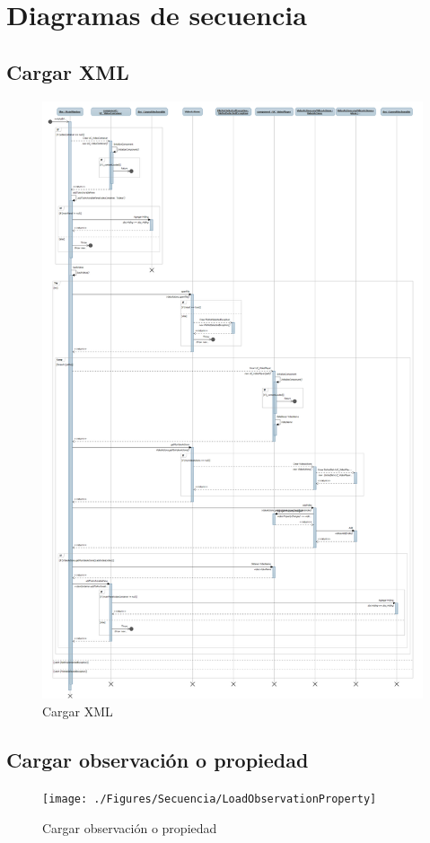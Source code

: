\chapter{Diagramas de secuencia}

\section{Cargar XML}

\begin{figure}[H]
\centering
\includegraphics[width=0.6\linewidth]{./Figures/Secuencia/CargarXML.png}
\caption{Cargar XML}
\label{fig:CargarXML}
\end{figure}


\section{Cargar observaci\'on o propiedad}

\begin{figure}[H]
\centering
\texttt{[image: ./Figures/Secuencia/LoadObservationProperty]}
\caption{Cargar observaci\'on o propiedad}
\label{fig:LoadObservationProperty}
\end{figure}



